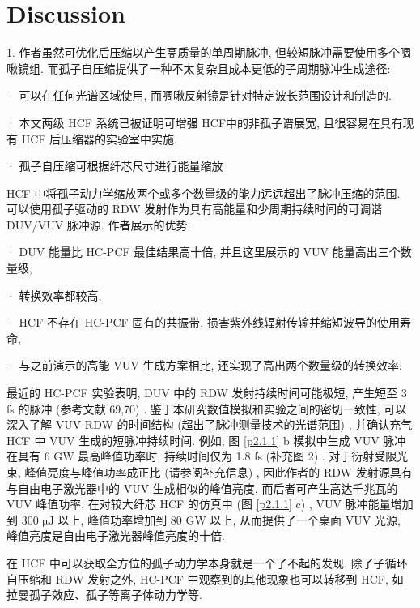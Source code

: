 \documentclass[14pt,a4paper,oneside]{article}
\numberwithin{equation}{subsection}             %
\numberwithin{figure}{subsection}               %
\begin{document}
\section{Discussion}

1. 作者虽然可优化后压缩以产生高质量的单周期脉冲, 但较短脉冲需要使用多个啁啾镜组. 而孤子自压缩提供了一种不太复杂且成本更低的子周期脉冲生成途径:

· 可以在任何光谱区域使用, 而啁啾反射镜是针对特定波长范围设计和制造的. 

· 本文两级 HCF 系统已被证明可增强 HCF中的非孤子谱展宽, 且很容易在具有现有 HCF 后压缩器的实验室中实施. 

· 孤子自压缩可根据纤芯尺寸进行能量缩放

HCF 中将孤子动力学缩放两个或多个数量级的能力远远超出了脉冲压缩的范围. 可以使用孤子驱动的 RDW 发射作为具有高能量和少周期持续时间的可调谐 DUV/VUV 脉冲源. 作者展示的优势:

· DUV 能量比 HC-PCF\cite{kottigGenerationMicrojoulePulses2017} 最佳结果高十倍, 并且这里展示的 VUV 能量高出三个数量级\cite{ermolovSupercontinuumGenerationVacuum2015}, 

· 转换效率都较高,

· HCF 不存在 HC-PCF 固有的共振带, 损害紫外线辐射传输并缩短波导的使用寿命,

· 与之前演示的高能 VUV 生成方案相比, 还实现了高出两个数量级的转换效率\cite{misogutiGenerationBroadbandVUV2001, ghotbiGenerationMJVacuum2010, shiGenerationMulticolorVacuum2013, zhouEfficientGenerationVacuum2014}. 

最近的 HC-PCF 实验表明, DUV 中的 RDW 发射持续时间可能极短, 产生短至 3 fs 的脉冲 (参考文献 69,70) . 鉴于本研究数值模拟和实验之间的密切一致性, 可以深入了解 VUV RDW 的时间结构 (超出了脉冲测量技术的光谱范围) , 并确认充气 HCF 中 VUV 生成的短脉冲持续时间. 例如, 图 \ref{p2.1.1} b 模拟中生成 VUV 脉冲在具有 6 GW 最高峰值功率时, 持续时间仅为 1.8 fs (补充图 2) . 对于衍射受限光束, 峰值亮度与峰值功率成正比 (请参阅补充信息) , 因此作者的 RDW 发射源具有与自由电子激光器中的 VUV 生成相似的峰值亮度, 而后者可产生高达千兆瓦的 VUV 峰值功率\cite{changTunableVUVPhotochemistry2018, ayvazyanGenerationGWRadiation2002}. 在对较大纤芯 HCF 的仿真中 (图 \ref{p2.1.1} c) , VUV 脉冲能量增加到 300 $\mathrm{\mu J}$ 以上, 峰值功率增加到 80 GW 以上, 从而提供了一个桌面 VUV 光源, 峰值亮度是自由电子激光器峰值亮度的十倍.

在 HCF 中可以获取全方位的孤子动力学本身就是一个了不起的发现. 除了子循环自压缩和 RDW 发射之外,  HC-PCF 中观察到的其他现象也可以转移到 HCF, 如拉曼孤子效应、孤子等离子体动力学等. 

\newpage

\clearpage           %
{}      %
{}   %


\end{document}
